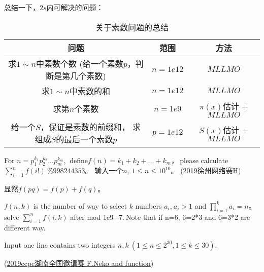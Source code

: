 \vbox{}

\begin{note}
	总结一下，$2s$内可解决的问题：
		\begin{table}[!htbp]
			\centering
			\caption{关于素数问题的总结 \label{tab:summaryforprime}}
			\begin{spacing}{1}
				\begin{tabular}{|c|c|c|}
					\toprule[1pt]
					问题 & 范围 & 方法 \\
					\midrule[1.5pt]
					\tabincell{c}{求$1\sim n$中素数个数 \\ (给一个素数$p$，判断是第几个素数)} &   $n= 1e12$ &  $MLLMO$ \\
					\midrule[1pt]
					求$1\sim n$中素数的和 &  $n=1e12$ & $MLLMO$  \\
					\midrule[1pt]
					求第$n$个素数  &  $n=1e9 $ &  $\pi(x)$估计 + $MLLMO$ \\
					\midrule[1pt]
					\tabincell{c}{给一个$S$，保证是素数的前缀和， \\ 求组成$S$的最后一个素数$p$}  &   $p=1e12$ &  $S(x)$估计 + $MLLMO$ \\
					\bottomrule[1pt]
				\end{tabular}%
			\end{spacing}
		\end{table}%
\end{note}

\vbox{}


\begin{example}
	For $n=p_1^{k_1}p_2^{k_2}...p_m^{k_m}$, $\ $define$f(n)=k_1 + k_2 + ... + k_m$，$\ $please calculate $\sum_{i=1}^n f(i!)\ \%998244353$。
	输入一个$n$, $1\le n \le 10^{10}$。
	(\href{https://nanti.jisuanke.com/t/41390}{2019徐州网络赛H})
\end{example}
\begin{solution}
	显然$f(pq) = f(p) + f(q)$。
\end{solution}





\vbox{}




\begin{example}
	$f(n,k)$ is the number of way to select $k$ numbers $a_i$,$\ a_i>1$ and $\prod_{i=1}^{k} a_{i} = n$。
	solve $\sum_{i = 1} ^ {n} f(i,k)$ after mod 1e9+7.$\ $Note that if n=6, 6=2*3 and 6=3*2 are different way.
	
	Input one line contains two integers $n,k\ (1\le n\le 2^{30},1\le k\le 30)$.
	
	(\href{http://acm.hdu.edu.cn/showproblem.php?pid=6537}{2019ccpc湖南全国邀请赛 F.Neko and function})
\end{example}

